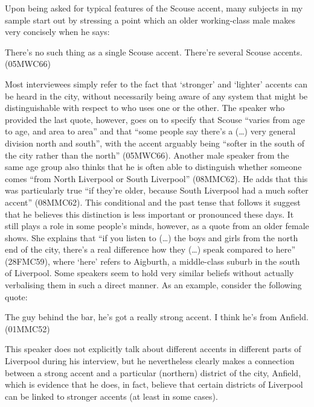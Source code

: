 Upon being asked for typical features of the Scouse accent, many subjects in my sample start out by stressing a point which an older working-class male makes very concisely when he says:
\begin{example}
	There's no such thing as a single Scouse accent. There're several Scouse accents. (05MWC66)
\end{example}
Most interviewees simply refer to the fact that `stronger' and `lighter' accents can be heard in the city, without necessarily being aware  of any system that might be distinguishable with respect to who uses one or the other.
The speaker who provided the last quote, however, goes on to specify that Scouse ``varies from age to age, and area to area'' and that ``some people say there's a (\ldots) very general division north and south'', with the accent arguably being ``softer in the south of the city rather than the north'' (05MWC66).
Another male speaker from the same age group also thinks that he is often able to distinguish whether someone comes ``from North Liverpool or South Liverpool'' (08MMC62).
He adds that this was particularly true ``if they're older, because South Liverpool had a much softer accent'' (08MMC62).
This conditional and the past tense that follows it suggest that he believes this distinction is less important or pronounced these days.
It still plays a role in some people's minds, however, as a quote from an older female shows.
She explains that ``if you listen to (\ldots) the boys and girls from the north end of the city, there's a real difference how they (\ldots) speak compared to here'' (28FMC59), where `here' refers to Aigburth, a middle-class suburb in the south of Liverpool.
Some speakers seem to hold very similar beliefs without actually verbalising them in such a direct manner.
As an example, consider the following quote:
\begin{example}
	The guy behind the bar, he's got a really strong accent. I think he's from Anfield. (01MMC52)
\end{example}
This speaker does not explicitly talk about different accents in different parts of Liverpool during his interview, but he nevertheless clearly makes a connection between a strong accent and a particular (northern) district of the city, Anfield, which is evidence that he does, in fact, believe that certain districts of Liverpool can be linked to stronger accents (at least in some cases).

